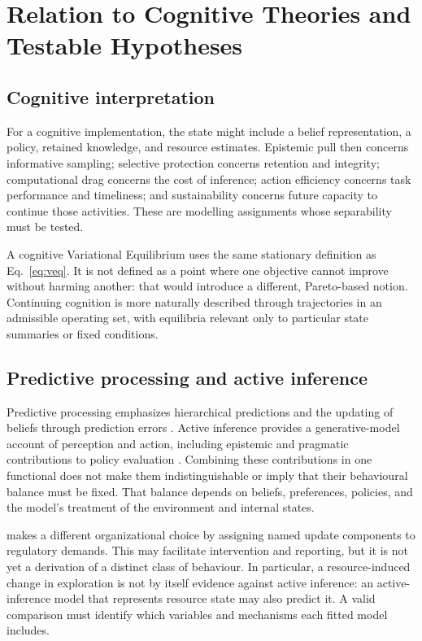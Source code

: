\section{Relation to Cognitive Theories and Testable Hypotheses}
\label{sec:cognitive_systems}

\subsection{Cognitive interpretation}
\label{subsec:cognition_forces}
For a cognitive implementation, the state might include a belief representation, a policy, retained knowledge, and resource estimates. Epistemic pull then concerns informative sampling; selective protection concerns retention and integrity; computational drag concerns the cost of inference; action efficiency concerns task performance and timeliness; and sustainability concerns future capacity to continue those activities. These are modelling assignments whose separability must be tested.

A cognitive Variational Equilibrium uses the same stationary definition as Eq.~\eqref{eq:veq}. It is not defined as a point where one objective cannot improve without harming another: that would introduce a different, Pareto-based notion. Continuing cognition is more naturally described through trajectories in an admissible operating set, with equilibria relevant only to particular state summaries or fixed conditions.

\subsection{Predictive processing and active inference}
\label{subsec:pp_ai}
Predictive processing emphasizes hierarchical predictions and the updating of beliefs through prediction errors \citep{clark2013whatever}. Active inference provides a generative-model account of perception and action, including epistemic and pragmatic contributions to policy evaluation \citep{friston2010fep,parr2018generalised,parr2022active}. Combining these contributions in one functional does not make them indistinguishable or imply that their behavioural balance must be fixed. That balance depends on beliefs, preferences, policies, and the model's treatment of the environment and internal states.

\uvif{} makes a different organizational choice by assigning named update components to regulatory demands. This may facilitate intervention and reporting, but it is not yet a derivation of a distinct class of behaviour. In particular, a resource-induced change in exploration is not by itself evidence against active inference: an active-inference model that represents resource state may also predict it. A valid comparison must identify which variables and mechanisms each fitted model includes.


